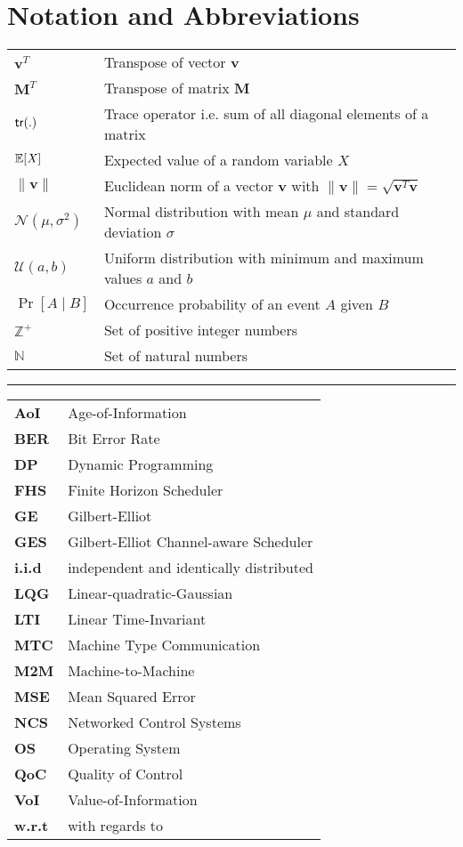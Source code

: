 \chapter*{Notation and Abbreviations}

\begin{tabular}{p{2cm} l} 
$\boldsymbol{v}^T$ & Transpose of vector $\boldsymbol{v}$\\
$\boldsymbol{M}^T$ & Transpose of matrix $\boldsymbol{M}$\\
$\mathsf{tr}(.)$ & Trace operator i.e. sum of all diagonal elements of a matrix\\
$\mathbb{E}[\mathit{X}]$ & Expected value of a random variable $\mathit{X}$\\
$\|\boldsymbol{v}\|$ & Euclidean norm of a vector $\boldsymbol{v}$ with $\|\boldsymbol{v}\|=\sqrt{\boldsymbol{v} ^T\boldsymbol{v}}$\\
$\mathcal{N}(\mu,\sigma^2)$ & Normal distribution with mean $\mu$ and standard deviation $\sigma$\\
$\mathcal{U}(a,b)$ & Uniform distribution with minimum and maximum values $a$ and $b$\\
$\Pr\left[A \mid B \right]$ & Occurrence probability of an event $A$ given $B$\\
$\mathbb{Z}^+$ & Set of positive integer numbers\\
$\mathbb{N}$ & Set of natural numbers\\
\end{tabular}
\vspace{1cm}

\hrule
\vspace{1cm}
  
\begin{tabular}{>{\bfseries}p{2cm} l}
AoI & Age-of-Information\\
BER & Bit Error Rate\\
DP & Dynamic Programming\\
FHS & Finite Horizon Scheduler\\
GE & Gilbert-Elliot\\
GES & Gilbert-Elliot Channel-aware Scheduler\\
i.i.d & independent and identically distributed\\
LQG & Linear-quadratic-Gaussian\\
LTI & Linear Time-Invariant\\
MTC & Machine Type Communication\\
M2M & Machine-to-Machine\\
MSE & Mean Squared Error\\
NCS & Networked Control Systems\\
OS & Operating System\\
QoC & Quality of Control\\
VoI & Value-of-Information\\
w.r.t & with regards to\\
\end{tabular}
